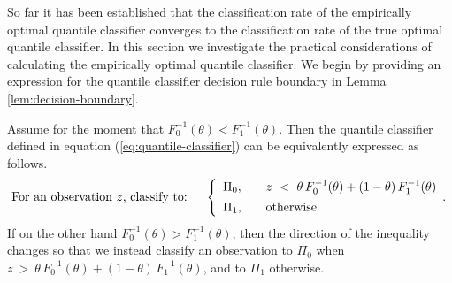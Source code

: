 So far it has been established that the classification rate of the empirically
optimal quantile classifier converges to the classification rate of the true
optimal quantile classifier.  In this section we investigate the practical
considerations of calculating the empirically optimal quantile classifier.  We
begin by providing an expression for the quantile classifier decision rule
boundary in Lemma \ref{lem:decision-boundary}.

\begin{lemma}
  \label{lem:decision-boundary}
  Assume for the moment that $F_{0}^{-1}(\theta) < F_{1}^{-1}(\theta)$.  Then
  the quantile classifier defined in equation (\ref{eq:quantile-classifier}) can
  be equivalently expressed as follows.
  \begin{equation}
    \label{eq:alt-quantile-classifier-less}
    \text{For an observation $z$, classify to:} \hspace{5mm} \left\{ 
      \begin{array}{lcl}
        \Pi_{0}, & & z ~<~ \theta\, F_{0}^{-1}(\theta) +
                       (1 - \theta)\, F_{1}^{-1}(\theta) \\[1ex]
        \Pi_{1}, & & \textup{otherwise}
      \end{array} .
    \right.
  \end{equation}
  If on the other hand $F_{0}^{-1}(\theta) > F_{1}^{-1}(\theta)$, then the
  direction of the inequality changes so that we instead classify an observation
  to $\Pi_0$ when
  $z ~>~ \theta\, F_{0}^{-1}(\theta) + (1 - \theta)\, F_{1}^{-1}(\theta)$, and
  to $\Pi_1$ otherwise.
\end{lemma}

